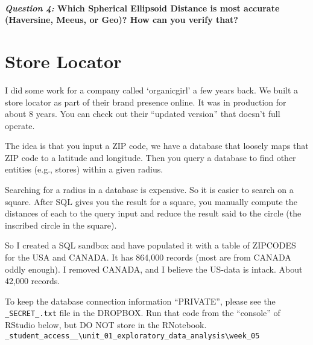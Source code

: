 \documentclass[
]{article}
\begin{document}
\hypertarget{question-4-which-spherical-ellipsoid-distance-is-most-accurate-haversine-meeus-or-geo-how-can-you-verify-that}{%
\paragraph{\texorpdfstring{\emph{Question 4:} Which Spherical Ellipsoid
Distance is most accurate (Haversine, Meeus, or Geo)? How can you verify
that?}{Question 4: Which Spherical Ellipsoid Distance is most accurate (Haversine, Meeus, or Geo)? How can you verify that?}}\label{question-4-which-spherical-ellipsoid-distance-is-most-accurate-haversine-meeus-or-geo-how-can-you-verify-that}}

\hypertarget{store-locator}{%
\section{Store Locator}\label{store-locator}}

I did some work for a company called `organicgirl' a few years back. We
built a store locator as part of their brand presence online. It was in
production for about 8 years. You can check out their ``updated
version'' that doesn't full operate.

The idea is that you input a ZIP code, we have a database that loosely
maps that ZIP code to a latitude and longitude. Then you query a
database to find other entities (e.g., stores) within a given radius.

Searching for a radius in a database is expensive. So it is easier to
search on a square. After SQL gives you the result for a square, you
manually compute the distances of each to the query input and reduce the
result said to the circle (the inscribed circle in the square).

So I created a SQL sandbox and have populated it with a table of
ZIPCODES for the USA and CANADA. It has 864,000 records (most are from
CANADA oddly enough). I removed CANADA, and I believe the US-data is
intack. About 42,000 records.

To keep the database connection information ``PRIVATE'', please see the
\texttt{\_SECRET\_.txt} file in the DROPBOX. Run that code from the
``console'' of RStudio below, but DO NOT store in the RNotebook.
\texttt{\_student\_access\_\_\textbackslash{}unit\_01\_exploratory\_data\_analysis\textbackslash{}week\_05}
\end{document}

